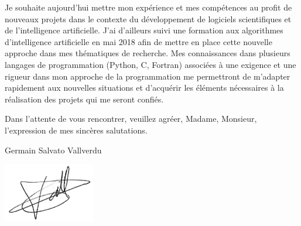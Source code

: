 \documentclass[11pt,a4paper,ragged2e]{../alta_letter}
\begin{document}
Je souhaite aujourd'hui mettre mon expérience et mes compétences au profit de nouveaux projets dans le contexte du développement de logiciels scientifiques et de l'intelligence artificielle. J'ai d'ailleurs suivi une formation aux algorithmes d'intelligence artificielle en mai 2018 afin de mettre en place cette nouvelle approche dans mes thématiques de recherche. Mes connaissances dans plusieurs langages de programmation (Python, C, Fortran) associées à une exigence et une rigueur dans mon approche de la programmation me permettront de m'adapter rapidement aux nouvelles situations et d'acquérir les éléments nécessaires à la réalisation des projets qui me seront confiés.

Dans l'attente de vous rencontrer, veuillez agréer, Madame, Monsieur, l'expression de mes sincères salutations.

\vspace{1cm}

\hspace{.6\textwidth}Germain Salvato Vallverdu

\hspace{.6\textwidth}\includegraphics[width=4cm]{../maSignature}
\end{document}
